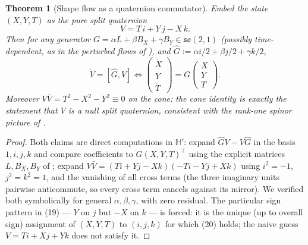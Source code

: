 \documentclass[12pt]{amsart}
\theoremstyle{plain}
\newtheorem{theorem}{Theorem}[section]
\theoremstyle{remark}
\begin{document}
\begin{theorem}[Shape flow as a quaternion commutator]\label{thm:laxshape}
Embed the state $(X,Y,T)$ as the pure split quaternion
\begin{equation}
V = T\,i + Y\,j - X\,k. \tag{19}
\end{equation}
Then for any generator $G=\alpha L+\beta B_X+\gamma B_Y\in\mathfrak{so}(2,1)$ (possibly time-dependent, as in the perturbed flows of \cite{Ebert2026Cone}), and $\hat G:=\alpha i/2+\beta j/2+\gamma k/2$,
\begin{equation}
\dot V=[\hat G,V] \iff \begin{pmatrix}\dot X\\ \dot Y\\ \dot T\end{pmatrix}=G\begin{pmatrix}X\\Y\\T\end{pmatrix}. \tag{20}
\end{equation}
Moreover $V\bar V=T^2-X^2-Y^2\equiv0$ on the cone: the cone identity is exactly the statement that $V$ is a \emph{null} split quaternion, consistent with the rank-one spinor picture of \cite{Ebert2026EigenCoord}.
\end{theorem}

\begin{proof}
Both claims are direct computations in $\mathbb H'$: expand $\hat GV-V\hat G$ in the basis $1,i,j,k$ and compare coefficients to $G(X,Y,T)^\top$ using the explicit matrices $L,B_X,B_Y$ of \cite{Ebert2026EigenCoord}; expand $V\bar V=(Ti+Yj-Xk)(-Ti-Yj+Xk)$ using $i^2=-1$, $j^2=k^2=1$, and the vanishing of all cross terms (the three imaginary units pairwise anticommute, so every cross term cancels against its mirror). We verified both symbolically for general $\alpha,\beta,\gamma$, with zero residual. The particular sign pattern in (19) --- $Y$ on $j$ but $-X$ on $k$ --- is forced: it is the unique (up to overall sign) assignment of $(X,Y,T)$ to $(i,j,k)$ for which (20) holds; the naive guess $V=Ti+Xj+Yk$ does not satisfy it.
\end{proof}
\end{document}

